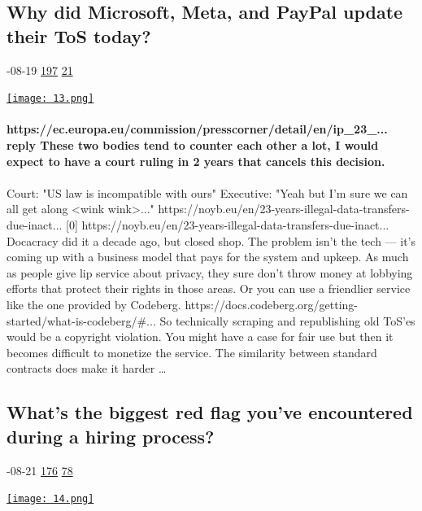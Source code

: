 \documentclass[10pt,a4paper]{article}
\begin{document}
\begin{multicols}{2}
\begin{minipage}{\linewidth}
\subsection{Why did Microsoft, Meta, and PayPal update their ToS today?}
\textsc{\footnotesize
{\scriptsize\faCalendar}-08-19 
{\scriptsize\faThumbsOUp}\space 
\href{}{197} 
{\scriptsize\faComments}\space 
\href{}{21} 
}
\par\medskip\noindent
\href{https://news.ycombinator.com/item?id=37185461\&utm\_source=hackernewsletter\&utm\_medium=email\&utm\_term=ask\_hn}{
    \texttt{[image: 13.png]}
}
\end{minipage}
\paragraph{}
\textbf{https://ec.europa.eu/commission/presscorner/detail/en/ip\_23\_...
reply
These two bodies tend to counter each other a lot, I would expect to have a court ruling in 2 years that cancels this decision.}
\paragraph{}

Court: "US law is incompatible with ours"
Executive: "Yeah but I'm sure we can all get along <wink wink>..."
https://noyb.eu/en/23-years-illegal-data-transfers-due-inact...
[0] https://noyb.eu/en/23-years-illegal-data-transfers-due-inact...
Docacracy did it a decade ago, but closed shop.
The problem isn’t the tech — it’s coming up with a business model that pays for the system and upkeep. As much as people give lip service about privacy, they sure don’t throw money at lobbying efforts that protect their rights in those areas.
Or you can use a friendlier service like the one provided by Codeberg.
https://docs.codeberg.org/getting-started/what-is-codeberg/\#...
So technically scraping and republishing old ToS'es would be a copyright violation. You might have a case for fair use but then it becomes difficult to monetize the service.
The similarity between standard contracts does make it harder
\dots\par
\noindent\begin{minipage}{\linewidth}
\medskip
\subsection{What's the biggest red flag you've encountered during a hiring process?}
\textsc{\footnotesize
{\scriptsize\faCalendar}-08-21 
{\scriptsize\faThumbsOUp}\space 
\href{}{176} 
{\scriptsize\faComments}\space 
\href{}{78} 
}
\par\medskip\noindent
\href{https://news.ycombinator.com/item?id=37210581\&utm\_source=hackernewsletter\&utm\_medium=email\&utm\_term=ask\_hn}{
    \texttt{[image: 14.png]}
}
\end{minipage}

\end{multicols}
\end{document}
